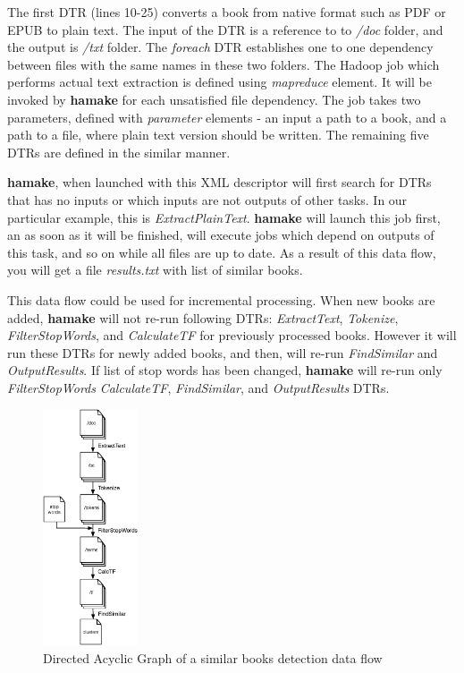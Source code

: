 \documentclass[10pt,conference,letterpaper]{IEEEtran}
\begin{document}


The first DTR (lines 10-25) converts a book from native format such as
PDF or EPUB to plain text. The input of the DTR is a reference to to
\emph{/doc} folder, and the output is \emph{/txt} folder. The
\emph{foreach} DTR establishes one to one dependency between files
with the same names in these two folders. The Hadoop job which
performs actual text extraction is defined using \emph{mapreduce}
element. It will be invoked by \textbf{hamake} for each unsatisfied
file dependency. The job takes two parameters, defined with
\emph{parameter} elements - an input a path to a book, and a path to a
file, where plain text version should be written. The remaining five
DTRs are defined in the similar manner.

\textbf{hamake}, when launched with this XML descriptor will first
search for DTRs that has no inputs or which inputs are not outputs of
other tasks. In our particular example, this is
\emph{ExtractPlainText}. \textbf{hamake} will launch this job first,
an as soon as it will be finished, will execute jobs which depend on
outputs of this task, and so on while all files are up to date. As a
result of this data flow, you will get a file \emph{results.txt} with
list of similar books.

This data flow could be used for incremental processing. When new
books are added, \textbf{hamake} will not re-run following DTRs:
\emph{ExtractText}, \emph{Tokenize}, \emph{FilterStopWords}, and
\emph{CalculateTF} for previously processed books. However it will run
these DTRs for newly added books, and then, will re-run
\emph{FindSimilar} and \emph{OutputResults}.  If list of stop words
has been changed, \textbf{hamake} will re-run only
\emph{FilterStopWords} \emph{CalculateTF}, \emph{FindSimilar}, and
\emph{OutputResults} DTRs.

\begin{figure}[htp]
\centering
\includegraphics[width=0.25\textwidth]{SimilarityAlgDAG.eps}
\caption{Directed Acyclic Graph of a similar books detection data flow}
\label{fig:SimilarityAlgDAG}
\end{figure}
\end{document}
